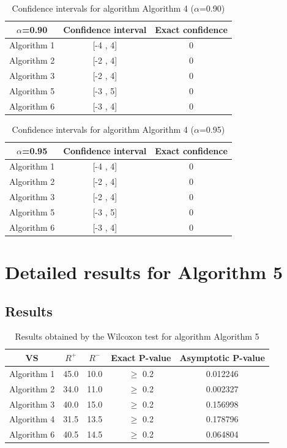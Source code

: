 \documentclass[a4paper,10pt]{article}
\begin{document}
\begin{table}[!htp]
\centering\small
\begin{tabular}{
|c|c|c|}
\hline
 $\alpha$=0.90 & Confidence interval & Exact confidence \\ \hline 
Algorithm 1 & [-4 , 4] & 0\\ \hline 
Algorithm 2 & [-2 , 4] & 0\\ \hline 
Algorithm 3 & [-2 , 4] & 0\\ \hline 
Algorithm 5 & [-3 , 5] & 0\\ \hline 
Algorithm 6 & [-3 , 4] & 0\\ \hline 

\end{tabular}
\caption{Confidence intervals for algorithm Algorithm 4 ($\alpha$=0.90)}
\end{table}
\begin{table}[!htp]
\centering\small
\begin{tabular}{
|c|c|c|}
\hline
 $\alpha$=0.95 & Confidence interval & Exact confidence \\ \hline 
Algorithm 1 & [-4 , 4] & 0\\ \hline 
Algorithm 2 & [-2 , 4] & 0\\ \hline 
Algorithm 3 & [-2 , 4] & 0\\ \hline 
Algorithm 5 & [-3 , 5] & 0\\ \hline 
Algorithm 6 & [-3 , 4] & 0\\ \hline 

\end{tabular}
\caption{Confidence intervals for algorithm Algorithm 4 ($\alpha$=0.95)}
\end{table}

 \clearpage 


\section{Detailed results for Algorithm 5}


\subsection{Results}

\begin{table}[!htp]
\centering\small
\begin{tabular}{
|c|c|c|c|c|}
\hline
 VS & $R^{+}$ & $R^{-}$ & Exact P-value & Asymptotic P-value \\ \hline 
Algorithm 1 & 45.0 & 10.0 & $\geq$ 0.2 & 0.012246\\ \hline 
Algorithm 2 & 34.0 & 11.0 & $\geq$ 0.2 & 0.002327\\ \hline 
Algorithm 3 & 40.0 & 15.0 & $\geq$ 0.2 & 0.156998\\ \hline 
Algorithm 4 & 31.5 & 13.5 & $\geq$ 0.2 & 0.178796\\ \hline 
Algorithm 6 & 40.5 & 14.5 & $\geq$ 0.2 & 0.064804\\ \hline 

\end{tabular}
\caption{Results obtained by the Wilcoxon test for algorithm Algorithm 5}
\end{table}
\end{document}
